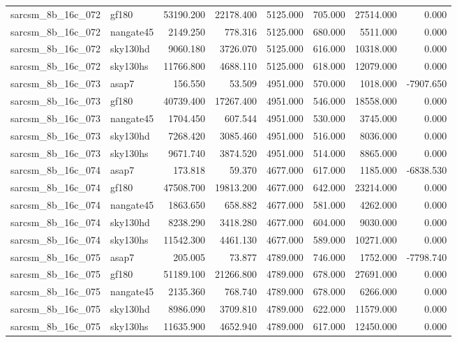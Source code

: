\begin{tabular}{llrrrrrr}
sarcsm\_8b\_16c\_072 & gf180 & 53190.200 & 22178.400 & 5125.000 & 705.000 & 27514.000 & 0.000 \\
sarcsm\_8b\_16c\_072 & nangate45 & 2149.250 & 778.316 & 5125.000 & 680.000 & 5511.000 & 0.000 \\
sarcsm\_8b\_16c\_072 & sky130hd & 9060.180 & 3726.070 & 5125.000 & 616.000 & 10318.000 & 0.000 \\
sarcsm\_8b\_16c\_072 & sky130hs & 11766.800 & 4688.110 & 5125.000 & 618.000 & 12079.000 & 0.000 \\
sarcsm\_8b\_16c\_073 & asap7 & 156.550 & 53.509 & 4951.000 & 570.000 & 1018.000 & -7907.650 \\
sarcsm\_8b\_16c\_073 & gf180 & 40739.400 & 17267.400 & 4951.000 & 546.000 & 18558.000 & 0.000 \\
sarcsm\_8b\_16c\_073 & nangate45 & 1704.450 & 607.544 & 4951.000 & 530.000 & 3745.000 & 0.000 \\
sarcsm\_8b\_16c\_073 & sky130hd & 7268.420 & 3085.460 & 4951.000 & 516.000 & 8036.000 & 0.000 \\
sarcsm\_8b\_16c\_073 & sky130hs & 9671.740 & 3874.520 & 4951.000 & 514.000 & 8865.000 & 0.000 \\
sarcsm\_8b\_16c\_074 & asap7 & 173.818 & 59.370 & 4677.000 & 617.000 & 1185.000 & -6838.530 \\
sarcsm\_8b\_16c\_074 & gf180 & 47508.700 & 19813.200 & 4677.000 & 642.000 & 23214.000 & 0.000 \\
sarcsm\_8b\_16c\_074 & nangate45 & 1863.650 & 658.882 & 4677.000 & 581.000 & 4262.000 & 0.000 \\
sarcsm\_8b\_16c\_074 & sky130hd & 8238.290 & 3418.280 & 4677.000 & 604.000 & 9030.000 & 0.000 \\
sarcsm\_8b\_16c\_074 & sky130hs & 11542.300 & 4461.130 & 4677.000 & 589.000 & 10271.000 & 0.000 \\
sarcsm\_8b\_16c\_075 & asap7 & 205.005 & 73.877 & 4789.000 & 746.000 & 1752.000 & -7798.740 \\
sarcsm\_8b\_16c\_075 & gf180 & 51189.100 & 21266.800 & 4789.000 & 678.000 & 27691.000 & 0.000 \\
sarcsm\_8b\_16c\_075 & nangate45 & 2135.360 & 768.740 & 4789.000 & 678.000 & 6266.000 & 0.000 \\
sarcsm\_8b\_16c\_075 & sky130hd & 8986.090 & 3709.810 & 4789.000 & 622.000 & 11579.000 & 0.000 \\
sarcsm\_8b\_16c\_075 & sky130hs & 11635.900 & 4652.940 & 4789.000 & 617.000 & 12450.000 & 0.000 \\

\end{tabular}
